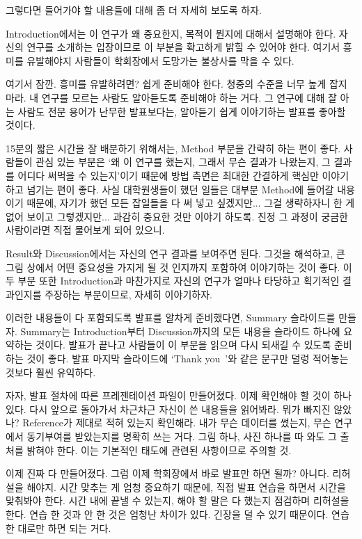 그렇다면 들어가야 할 내용들에 대해 좀 더 자세히 보도록 하자.

Introduction에서는 이 연구가 왜 중요한지, 목적이 뭔지에 대해서 설명해야
한다. 자신의 연구를 소개하는 입장이므로 이 부분을 확고하게 밝힐 수 있어야
한다. 여기서 흥미를 유발해야지 사람들이 학회장에서 도망가는 불상사를 막을 수
있다.

여기서 잠깐. 흥미를 유발하려면? 쉽게 준비해야 한다. 청중의 수준을 너무 높게 잡지
마라. 내 연구를 모르는 사람도 알아듣도록 준비해야 하는 거다. 그 연구에 대해 잘
아는 사람도 전문 용어가 난무한 발표보다는, 알아듣기 쉽게 이야기하는 발표를 좋아할
것이다.

15분의 짧은 시간을 잘 배분하기 위해서는, Method 부분을 간략히 하는 편이
좋다. 사람들이 관심 있는 부분은 ‘왜 이 연구를 했는지, 그래서 무슨 결과가
나왔는지, 그 결과를 어디다 써먹을 수 있는지’이기 때문에 방법 측면은 최대한
간결하게 핵심만 이야기하고 넘기는 편이 좋다. 사실 대학원생들이 했던 일들은 대부분
Method에 들어갈 내용이기 때문에, 자기가 했던 모든 잡일들을 다 써 넣고
싶겠지만... 그걸 생략하자니 한 게 없어 보이고 그렇겠지만... 과감히 중요한 것만
이야기 하도록. 진정 그 과정이 궁금한 사람이라면 직접 물어보게 되어 있으니.

Result와 Discussion에서는 자신의 연구 결과를 보여주면 된다. 그것을 해석하고, 큰
그림 상에서 어떤 중요성을 가지게 될 것 인지까지 포함하여 이야기하는 것이 좋다. 이
두 부분 또한 Introduction과 마찬가지로 자신의 연구가 얼마나 타당하고 획기적인
결과인지를 주장하는 부분이므로, 자세히 이야기하자.

이러한 내용들이 다 포함되도록 발표를 알차게 준비했다면, Summary 슬라이드를
만들자. Summary는 Introduction부터 Discussion까지의 모든 내용을 슬라이드 하나에
요약하는 것이다. 발표가 끝나고 사람들이 이 부분을 읽으며 다시 되새길 수 있도록
준비하는 것이 좋다. 발표 마지막 슬라이드에 ‘Thank you~’와 같은 문구만 덜렁
적어놓는 것보다 훨씬 유익하다.

자자, 발표 절차에 따른 프레젠테이션 파일이 만들어졌다. 이제 확인해야 할 것이 하나
있다. 다시 앞으로 돌아가서 차근차근 자신이 쓴 내용들을 읽어봐라. 뭐가 빠지진
않았나? Reference가 제대로 적혀 있는지 확인해라. 내가 무슨 데이터를 썼는지, 무슨
연구에서 동기부여를 받았는지를 명확히 쓰는 거다. 그림 하나, 사진 하나를 따 와도
그 출처를 밝혀야 한다. 이는 기본적인 태도에 관련된 사항이므로 주의할 것.

이제 진짜 다 만들어졌다. 그럼 이제 학회장에서 바로 발표만 하면 될까?
아니다. 리허설을 해야지. 시간 맞추는 게 엄청 중요하기 때문에, 직접 발표 연습을
하면서 시간을 맞춰봐야 한다. 시간 내에 끝낼 수 있는지, 해야 할 말은 다 했는지
점검하며 리허설을 한다. 연습 한 것과 안 한 것은 엄청난 차이가 있다. 긴장을 덜 수
있기 때문이다. 연습한 대로만 하면 되는 거다.

